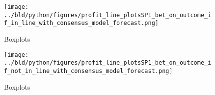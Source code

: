 \documentclass[11pt, a4paper, leqno]{article}
\begin{document}
\begin{figure}[H]
    \centering
    \texttt{[image: ../bld/python/figures/profit\_line\_plotsSP1\_bet\_on\_outcome\_if\_in\_line\_with\_consensus\_model\_forecast.png]}
    \caption{Boxplots}
    \label{fig:figure2}
\end{figure}
\begin{figure}[H]
    \centering
    \texttt{[image: ../bld/python/figures/profit\_line\_plotsSP1\_bet\_on\_outcome\_if\_not\_in\_line\_with\_consensus\_model\_forecast.png]}
    \caption{Boxplots}
    \label{fig:figure2}
\end{figure}











\end{document}
